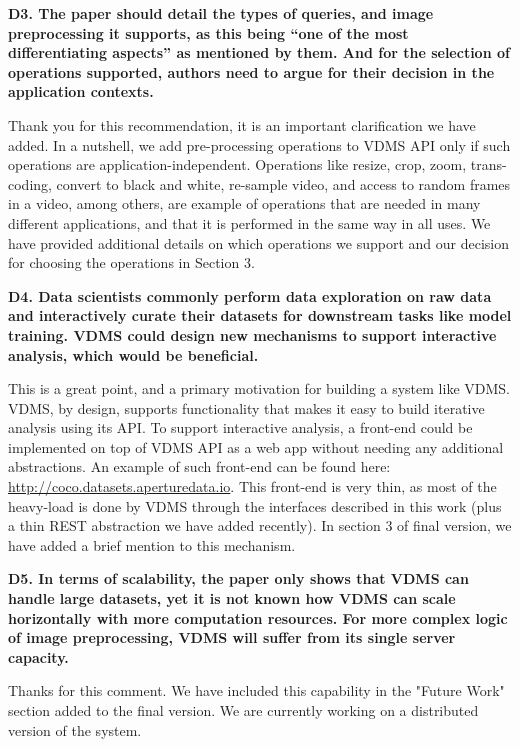 \documentclass[11pt]{proposalnsf}
\begin{document}
\bigskip
\noindent %
\textbf{
D3. The paper should detail the types of queries, and image preprocessing it supports,
as this being “one of the most differentiating aspects” as mentioned by them.
And for the selection of operations supported, authors need to argue for their
decision in the application contexts.
}\bigskip

Thank you for this recommendation, it is an important clarification we have added.
In a nutshell, we add pre-processing operations to VDMS API only if such
operations are application-independent.
Operations like resize, crop, zoom, trans-coding, convert to black and white,
re-sample video, and access to random frames in a video, among others, are
example of operations that are needed in many different applications,
and that it is performed in the same way in all uses.
We have provided additional details on which operations we support and our
decision for choosing the operations in Section 3.

\bigskip
\noindent %
\textbf{
D4. Data scientists commonly perform data exploration on raw data and interactively
curate their datasets for downstream tasks like model training.
VDMS could design new mechanisms to support interactive analysis,
which would be beneficial.
}\bigskip

This is a great point, and a primary motivation for building a system like VDMS.
VDMS, by design, supports functionality that makes it easy to build
iterative analysis using its API.
To support interactive analysis, a front-end could be implemented on top of
VDMS API as a web app without needing any additional abstractions.
An example of such front-end can be found here:
\url{http://coco.datasets.aperturedata.io}.
This front-end is very thin, as most of the heavy-load is done by VDMS through
the interfaces described in this work
(plus a thin REST abstraction we have added recently).
In section 3 of final version, we have added a brief mention to this mechanism.

\bigskip
\noindent %
\textbf{
D5. In terms of scalability, the paper only shows that VDMS can handle large
datasets, yet it is not known how VDMS can scale horizontally with more
computation resources.
For more complex logic of image preprocessing, VDMS will suffer from its
single server capacity.
}\bigskip

Thanks for this comment.
We have included this capability in the "Future Work" section
added to the final version.
We are currently working on a distributed version of the system.
\end{document}
